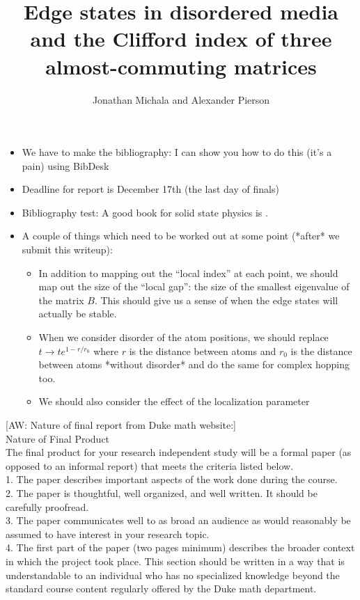 \documentclass[a4paper]{article}
\title{Edge states in disordered media and the Clifford index of three almost-commuting matrices}
\author{Jonathan Michala and Alexander Pierson}
\newcommand{\aw}[1]{{\color{blue} [AW: #1]}}
\begin{document}
\begin{itemize}
\item We have to make the bibliography: I can show you how to do this (it's a pain) using BibDesk
\item Deadline for report is December 17th (the last day of finals)
\item Bibliography test: A good book for solid state physics is \cite{1976AshcroftMermin}.
\item A couple of things which need to be worked out at some point (*after* we submit this writeup):
\begin{itemize}
\item In addition to mapping out the ``local index'' at each point, we should map out the size of the ``local gap'': the size of the smallest eigenvalue of the matrix $B$. This should give us a sense of when the edge states will actually be stable.
\item When we consider disorder of the atom positions, we should replace $t \rightarrow t e^{1 - r/r_0}$ where $r$ is the distance between atoms and $r_0$ is the distance between atoms *without disorder* and do the same for complex hopping too.
\item We should also consider the effect of the localization parameter
\end{itemize}
\end{itemize}
\aw{Nature of final report from Duke math website:} \\

Nature of Final Product \\

The final product for your research independent study will be a formal paper (as opposed to an informal report) that meets the criteria listed below. \\

1. The paper describes important aspects of the work done during the course. \\

2. The paper is thoughtful, well organized, and well written. It should be carefully proofread. \\

3. The paper communicates well to as broad an audience as would reasonably be assumed to have interest in your research topic. \\

4. The first part of the paper (two pages minimum) describes the broader context in which the project took place. This section should be written in a way that is understandable to an individual who has no specialized knowledge beyond the standard course content regularly offered by the Duke math department. \\
\end{document}
